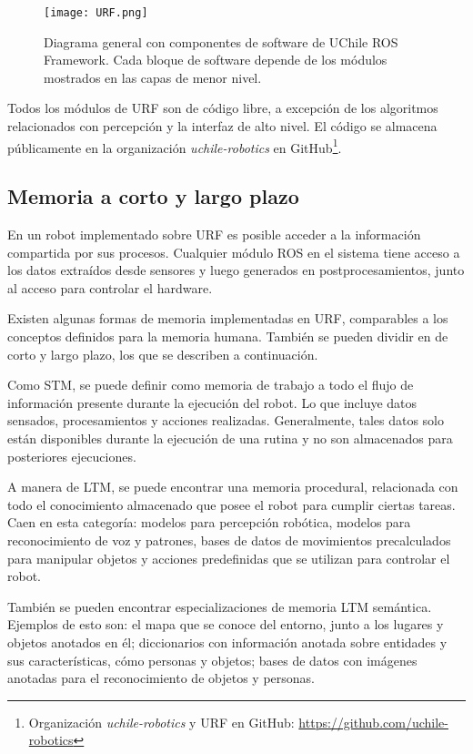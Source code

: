 \begin{figure}[!ht]
	\centering
	\texttt{[image: URF.png]}
	\caption[Componentes de UChile ROS Framework.]
	{\small Diagrama general con componentes de software de UChile ROS Framework. Cada bloque de software depende de los módulos mostrados en las capas de menor nivel.}
	\label{img:URF}
\end{figure}

Todos los módulos de URF son de código libre, a excepción de los algoritmos relacionados con percepción y la interfaz de alto nivel. El código se almacena públicamente en la organización \textit{uchile-robotics} en GitHub\footnote{Organización \textit{uchile-robotics} y URF en GitHub: \url{https://github.com/uchile-robotics}}.


\subsection{Memoria a corto y largo plazo}

En un robot implementado sobre URF es posible acceder a la información compartida por sus procesos. Cualquier módulo ROS en el sistema tiene acceso a los datos extraídos desde sensores y luego generados en postprocesamientos, junto al acceso para controlar el hardware.

Existen algunas formas de memoria implementadas en URF, comparables a los conceptos definidos para la memoria humana. También se pueden dividir en de corto y largo plazo, los que se describen a continuación.

Como STM, se puede definir como memoria de trabajo a todo el flujo de información presente durante la ejecución del robot. Lo que incluye datos sensados, procesamientos y acciones realizadas. Generalmente, tales datos solo están disponibles durante la ejecución de una rutina y no son almacenados para posteriores ejecuciones.

A manera de LTM, se puede encontrar una memoria procedural, relacionada con todo el conocimiento almacenado que posee el robot para cumplir ciertas tareas. Caen en esta categoría: modelos para percepción robótica, modelos para reconocimiento de voz y patrones, bases de datos de movimientos precalculados para manipular objetos y acciones predefinidas que se utilizan para controlar el robot.

También se pueden encontrar especializaciones de memoria LTM semántica. Ejemplos de esto son: el mapa que se conoce del entorno, junto a los lugares y objetos anotados en él; diccionarios con información anotada sobre entidades y sus características, cómo personas y objetos; bases de datos con imágenes anotadas para el reconocimiento de objetos y personas. 

